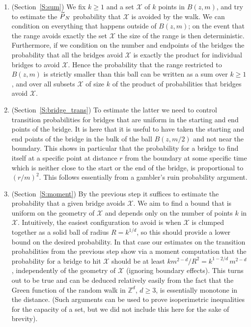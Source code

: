 \documentclass[AHL, Unicode, longabstracts, published]{cedram}
\newcommand{\cX}{\mathcal{X}}
\let\oldtilde\tilde
\renewcommand*{\tilde}[1]{\mathchoice{\widetilde{#1}}{\widetilde{#1}}{\oldtilde{#1}}{\oldtilde{#1}}}\let\oldhat\hat
\renewcommand*{\hat}[1]{\mathchoice{\widehat{#1}}{\widehat{#1}}{\oldhat{#1}}{\oldhat{#1}}}\let\oldexists\exists
\renewcommand*{\exists}{\mathrel{\oldexists}}
\begin{document}
\begin{enumerate}
\item (Section~\ref{S:sum})\label{list.2.3.1.3} We fix $k \ge 1$ and a set $\cX$ of $k$ points in $B(z, m)$, and try to estimate the $\tilde P_N$ probability that $\cX$ is avoided by the walk. We can condition on everything that happens outside of $B(z,m)$; on the event that the range avoids exactly the set $\cX$ the size of the range is then deterministic. Furthermore, if we condition on the number and endpoints of the bridges the probability that all the bridges avoid $\cX$ is exactly the product for individual bridges to avoid $\cX$. Hence the probability that the range restricted to $B(z,m)$ is strictly smaller than this ball can be written as a sum over $k\ge 1$, and over all subsets $\cX$ of size $k$ of the product of probabilities that bridges avoid $\cX$.
%
\item (Section~\ref{S:bridge_trans})\label{list.2.3.1.4} To estimate the latter we need to control transition probabilities for bridges that are uniform in the starting and end points of the bridge. It is here that it is useful to have taken the starting and end points of the bridge in the bulk of the ball $B(z, m/2)$ and not near the boundary. This shows in particular that the probability for a bridge to find itself at a specific point at distance $r$ from the boundary at some specific time which is neither close to the start or the end of the bridge, is proportional to $(r/m)^2$. This follows essentially from a gambler's ruin probability argument.


\item (Section~\ref{S:moment})\label{list.2.3.1.5} By the previous step it suffices to estimate the probability that a given bridge avoids $\cX$. We aim to find a bound that is uniform on the geometry of $\cX$ and depends only on the number of points $k$ in $\cX$. Intuitively, the easiest configuration to avoid is when $\cX$ is clumped together as a solid ball of radius $R = k^{1/d}$, so this should provide a lower bound on the desired probability. In that case our estimates on the transition probabilities from the previous step show via a moment computation that the probability for a bridge to hit $\cX$ should be at least $km^{2-d}/R^2 = k^{1- 2/d}\,m^{2-d}$, independently of the geometry of $\cX$ (ignoring boundary effects). This turns out to be true and can be deduced relatively easily from the fact that the Green function of the random walk in $\mathbb{Z}^d$, $d \ge 3$, is essentially monotone in the distance. (Such arguments can be used to prove isoperimetric inequalities for the capacity of a set, but we did not include this here for the sake of brevity).
\end{enumerate}
\end{document}
